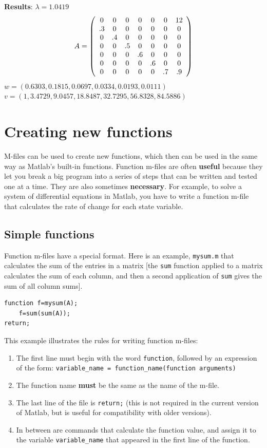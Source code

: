 \documentclass [11pt]{article}
\numberwithin{exercise}{section}
\begin{document}
\textbf{Results}: $\lambda =1.0419$
\[
A = \left( {\begin{array}{*{20}c}
   0 & 0 & 0 & 0 & 0 & 0 & {12}  \\
   {.3} & 0 & 0 & 0 & 0 & 0 & 0  \\
   0 & {.4} & 0 & 0 & 0 & 0 & 0  \\
   0 & 0 & {.5} & 0 & 0 & 0 & 0  \\
   0 & 0 & 0 & {.6} & 0 & 0 & 0  \\
   0 & 0 & 0 & 0 & {.6} & 0 & 0  \\
   0 & 0 & 0 & 0 & 0 & {.7} & {.9}  \\

 \end{array} } \right)
\]
$w = (0.6303,0.1815,0.0697,0.0334,0.0193,0.0111)$ \\
$v = (1,3.4729,9.0457,18.8487,32.7295,56.8328,84.5886)$ \\

\section{Creating new functions}
M-files can be used to create new functions, which then can be used in the 
same way as Matlab's built-in functions. Function m-files are often 
\textbf{useful} because they let you break a big program into a series of 
steps that can be written and tested one at a time. They are also sometimes 
\textbf{necessary}. For example, to solve a system of differential equations 
in Matlab, you have to write a function m-file that calculates the rate of change 
for each state variable. 

\subsection{Simple functions}  
Function m-files have a special format. Here 
is an example, \texttt{mysum.m} that calculates the sum of the entries in a 
matrix [the \texttt{sum} function applied to a matrix calculates the sum of 
each column, and then a second application of \texttt{sum} gives the sum of 
all column sums]. 
\begin{verbatim}
function f=mysum(A);
    f=sum(sum(A));
return;
\end{verbatim} 
This example illustrates the rules for writing function m-files: 
\begin{enumerate}
\item The first line must begin with the word \texttt{function}, followed by an 
expression of the form: \texttt{variable\_name = function\_name(function arguments)} 
\item The function name \textbf{must} be the same as the name of the m-file. 
\item The last line of the file is \texttt{return;} (this is not required in the 
current version of Matlab, but is useful for compatibility with older versions). 
\item In between are commands that calculate the function value, and assign it to the 
variable \texttt{variable\_name} that appeared in the first line of the function. 
\end{enumerate}
\end{document}
